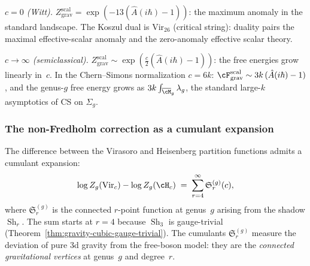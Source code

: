 \emph{$c = 0$ (Witt).}\enspace
$Z_{\mathrm{grav}}^{\mathrm{scal}} = \exp(-13(\hat A(i\hbar)-1))$:
the maximum anomaly in the standard landscape. The
Koszul dual is $\mathrm{Vir}_{26}$ (critical string):
duality pairs the maximal effective-scalar anomaly and the
zero-anomaly effective scalar theory.

\emph{$c \to \infty$ (semiclassical).}\enspace
$Z_{\mathrm{grav}}^{\mathrm{scal}} \sim \exp\left(\frac{c}{2}(\hat A(i\hbar)-1)
\right)$: the free energies grow linearly in~$c$. In the
Chern--Simons normalization $c = 6k$:
$\cF_{\mathrm{grav}}^{\mathrm{scal}} \sim 3k\,(\hat A(i\hbar)-1)$, and the genus-$g$ free energy
grows as $3k \int_{\overline{\cM}_g}\lambda_g$, the standard
large-$k$ asymptotics of CS on $\Sigma_g$.

\subsubsection*{The non-Fredholm correction as a cumulant expansion}

\begin{remark}
\label{rem:gravity-cumulant-interpretation}
The difference between the Virasoro and Heisenberg partition
functions admits a cumulant expansion:
\[
\log Z_g(\mathrm{Vir}_c)
- \log Z_g(\cH_c)
\;=\;
\sum_{r=4}^{\infty}
\mathfrak{S}_r^{(g)}(c),
\]
where $\mathfrak{S}_r^{(g)}$ is the connected $r$-point
function at genus~$g$ arising from the shadow
$\operatorname{Sh}_r$. The sum starts at $r = 4$ because
$\operatorname{Sh}_3$ is gauge-trivial
(Theorem~\ref{thm:gravity-cubic-gauge-trivial}). The cumulants
$\mathfrak{S}_r^{(g)}$ measure the deviation of pure 3d
gravity from the free-boson model: they are the
\emph{connected gravitational vertices} at genus~$g$ and degree~$r$.
\end{remark}

